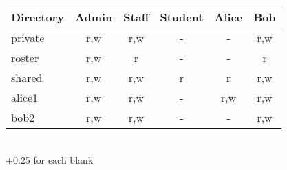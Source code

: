 \documentclass[addpoints]{exam}
\begin{document}
\begin{questions}
\begin{parts}
\begin{solutionorbox}[1in]
\begin{tabular}[c]{l||c|c|c|c|c}
\hline
Directory & Admin & Staff & Student & Alice & Bob \\ \hline \hline
private & r,w & r,w & - & - & r,w \\ \hline
roster & r,w & r & - & - & r \\ \hline
shared & r,w & r,w & r & r & r,w \\ \hline
alice1 & r,w & r,w & - & r,w & r,w \\ \hline
bob2 & r,w & r,w & - & - & r,w \\
\hline
\end{tabular}
\\ +0.25 for each blank
\end{solutionorbox}






\end{parts}
\end{questions}
\end{document}
